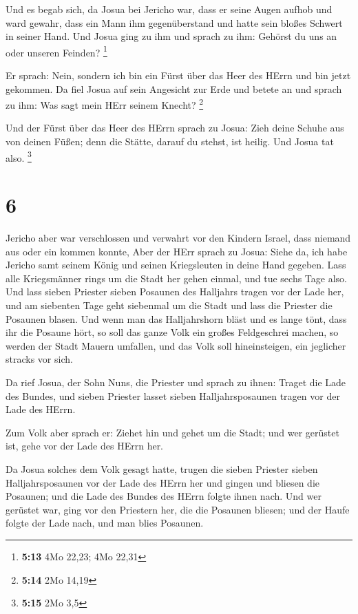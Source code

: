  Und es begab sich, da Josua bei Jericho war, dass er seine
Augen aufhob und ward gewahr, dass ein Mann ihm gegenüberstand und hatte
sein bloßes Schwert in seiner Hand. Und Josua ging zu ihm und sprach zu
ihm: Gehörst du uns an oder unseren Feinden? \footnote{\textbf{5:13} 4Mo
  22,23; 4Mo 22,31}

 Er sprach: Nein, sondern ich bin ein Fürst über das Heer
des HErrn und bin jetzt gekommen. Da fiel Josua auf sein Angesicht zur
Erde und betete an und sprach zu ihm: Was sagt mein HErr seinem Knecht?
\footnote{\textbf{5:14} 2Mo 14,19}

 Und der Fürst über das Heer des HErrn sprach zu Josua:
Zieh deine Schuhe aus von deinen Füßen; denn die Stätte, darauf du
stehst, ist heilig. Und Josua tat also. \footnote{\textbf{5:15} 2Mo 3,5}

\hypertarget{section-1}{%
\section{6}\label{section-1}}

 Jericho aber war verschlossen und verwahrt vor den Kindern
Israel, dass niemand aus oder ein kommen konnte,  Aber der
HErr sprach zu Josua: Siehe da, ich habe Jericho samt seinem König und
seinen Kriegsleuten in deine Hand gegeben.  Lass alle
Kriegsmänner rings um die Stadt her gehen einmal, und tue sechs Tage
also.  Und lass sieben Priester sieben Posaunen des
Halljahrs tragen vor der Lade her, und am siebenten Tage geht siebenmal
um die Stadt und lass die Priester die Posaunen blasen.  Und
wenn man das Halljahrshorn bläst und es lange tönt, dass ihr die Posaune
hört, so soll das ganze Volk ein großes Feldgeschrei machen, so werden
der Stadt Mauern umfallen, und das Volk soll hineinsteigen, ein
jeglicher stracks vor sich.

 Da rief Josua, der Sohn Nuns, die Priester und sprach zu
ihnen: Traget die Lade des Bundes, und sieben Priester lasset sieben
Halljahrsposaunen tragen vor der Lade des HErrn.

 Zum Volk aber sprach er: Ziehet hin und gehet um die Stadt;
und wer gerüstet ist, gehe vor der Lade des HErrn her.

 Da Josua solches dem Volk gesagt hatte, trugen die sieben
Priester sieben Halljahrsposaunen vor der Lade des HErrn her und gingen
und bliesen die Posaunen; und die Lade des Bundes des HErrn folgte ihnen
nach.  Und wer gerüstet war, ging vor den Priestern her, die
die Posaunen bliesen; und der Haufe folgte der Lade nach, und man blies
Posaunen.

